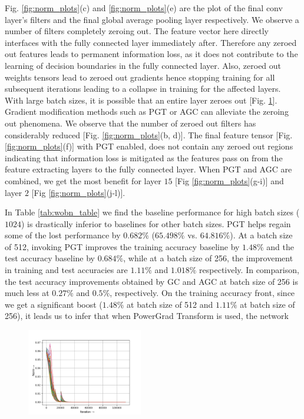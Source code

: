 \documentclass[runningheads]{llncs}
\begin{document}
Fig. \ref{fig:norm_plots}(c) and \ref{fig:norm_plots}(e) are the plot of the final conv
layer's filters and the final global average pooling layer respectively. We observe a
number of filters completely zeroing out. The feature vector here directly interfaces
with the fully connected layer immediately after. Therefore any zeroed out features
leads to permanent information loss, as it does not contribute to the learning of
decision boundaries in the fully connected layer. Also, zeroed out weights tensors lead
to zeroed out gradients hence stopping training for all subsequent iterations leading to
a collapse in training for the affected layers. With large batch sizes, it is possible
that an entire layer zeroes out [Fig. \ref{fig:high_bs}]. Gradient modification methods
such as PGT or AGC can alleviate the zeroing out phenomena. We observe that the number
of zeroed out filters has considerably reduced [Fig. \ref{fig:norm_plots}(b, d)]. The
final feature tensor [Fig. \ref{fig:norm_plots}(f)] with PGT enabled, does not contain
any zeroed out regions indicating that information loss is mitigated as the features
pass on from the feature extracting layers to the fully connected layer. When PGT and
AGC are combined, we get the most benefit for layer $15$ [Fig \ref{fig:norm_plots}(g-i)]
and layer $2$ [Fig \ref{fig:norm_plots}(j-l)].







In Table \ref{tab:wobn_table} we find the baseline performance for high batch sizes
($1024$) is drastically inferior to baselines for other batch sizes. PGT helps regain
some of the lost performance by $0.682\%$ ($65.498\%$ vs. $64.816\%$). At a batch size
of 512, invoking PGT improves the training accuracy baseline by $1.48\%$ and the test
accuracy baseline by $0.684\%$, while at a batch size of 256, the improvement in
training and test accuracies are $1.11\%$ and $1.018\%$ respectively. In comparison, the
test accuracy improvements obtained by GC and AGC at batch size of 256
is much less at $0.27\%$ and $0.5\%$, respectively. On the training accuracy front,
since we get a significant boost ($1.48\%$ at batch size of 512 and $1.11\%$ at batch
size of 256), it leads us to infer that when PowerGrad Transform is used, the network


\begin{figure}
\vspace{-1cm}
\centering
\includegraphics[width=0.45\textwidth]{baseline_high_bs-w-layer2-2}
\caption{}
\label{fig:high_bs}
\vspace{-2cm}
\end{figure}
\end{document}
